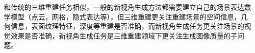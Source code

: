 和传统的三维重建任务相似，一般的新视角生成方法都需要建立自己的场景表达数学模型（点云，网格，隐式表达等），但三维重建更关注重建场景的空间信息，几何信息，表面纹理特征，深度等重建是否准确，而新视角生成任务更关注场景的视觉效果是否准确，新视角生成任务是三维重建领域下更关注生成图像质量的子问题。